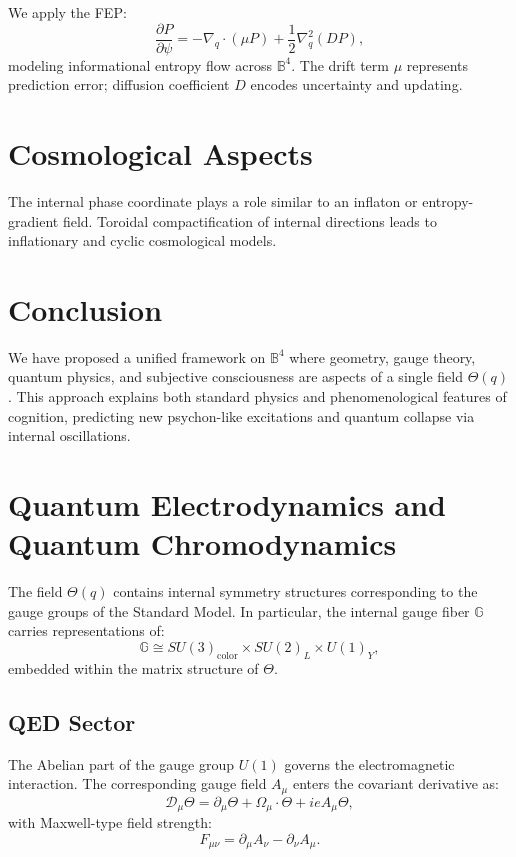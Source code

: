 \documentclass[12pt]{article}
\begin{document}
We apply the FEP:
\[
\frac{\partial P}{\partial \psi} = -\nabla_q \cdot (\mu P) + \frac{1}{2} \nabla_q^2 (D P),
\]
modeling informational entropy flow across \( \mathbb{B}^4 \). The drift term $\mu$ represents prediction error; diffusion coefficient $D$ encodes uncertainty and updating.

\section{Cosmological Aspects}

The internal phase coordinate plays a role similar to an inflaton or entropy-gradient field. Toroidal compactification of internal directions leads to inflationary and cyclic cosmological models.

\section{Conclusion}

We have proposed a unified framework on \( \mathbb{B}^4 \) where geometry, gauge theory, quantum physics, and subjective consciousness are aspects of a single field \( \Theta(q) \). This approach explains both standard physics and phenomenological features of cognition, predicting new psychon-like excitations and quantum collapse via internal oscillations.


\section{Quantum Electrodynamics and Quantum Chromodynamics}

The field \( \Theta(q) \) contains internal symmetry structures corresponding to the gauge groups of the Standard Model. In particular, the internal gauge fiber \( \mathbb{G} \) carries representations of:
\[
\mathbb{G} \cong SU(3)_\text{color} \times SU(2)_L \times U(1)_Y,
\]
embedded within the matrix structure of \( \Theta \).

\subsection{QED Sector}

The Abelian part of the gauge group \( U(1) \) governs the electromagnetic interaction. The corresponding gauge field \( A_\mu \) enters the covariant derivative as:
\[
\mathcal{D}_\mu \Theta = \partial_\mu \Theta + \Omega_\mu \cdot \Theta + i e A_\mu \Theta,
\]
with Maxwell-type field strength:
\[
F_{\mu\nu} = \partial_\mu A_\nu - \partial_\nu A_\mu.
\]
\end{document}
